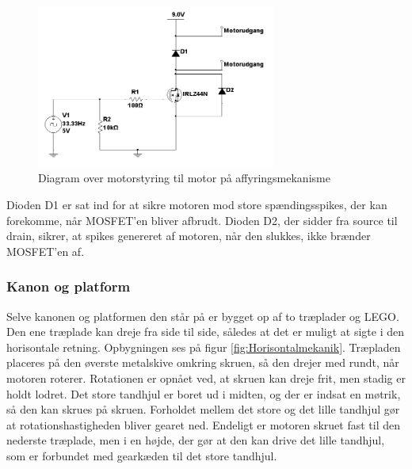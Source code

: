 \begin{figure}[H]
	\centering
	\includegraphics[width=0.7\textwidth]{Afsnit/DesignOgImplementering/images/affyringsmotor}
	\caption{Diagram over motorstyring til motor på affyringsmekanisme}
	\label{fig:affyringsmotor}
\end{figure}

Dioden D1 er sat ind for at sikre motoren mod store spændingsspikes, der kan forekomme, når MOSFET'en bliver afbrudt. Dioden D2, der sidder fra source til drain, sikrer, at spikes genereret af motoren, når den slukkes, ikke brænder MOSFET'en af. 

\subsubsection{Kanon og platform}
Selve kanonen og platformen den står på er bygget op af to træplader og LEGO. Den ene træplade kan dreje fra side til side, således at det er muligt at sigte i den horisontale retning. Opbygningen ses på figur \ref{fig:Horisontalmekanik}. Træpladen placeres på den øverste metalskive omkring skruen, så den drejer med rundt, når motoren roterer. Rotationen er opnået ved, at skruen kan dreje frit, men stadig er holdt lodret. Det store tandhjul er boret ud i midten, og der er indsat en møtrik, så den kan skrues på skruen. Forholdet mellem det store og det lille tandhjul gør at rotationshastigheden bliver gearet ned. Endeligt er motoren skruet fast til den nederste træplade, men i en højde, der gør at den kan drive det lille tandhjul, som er forbundet med gearkæden til det store tandhjul. 

